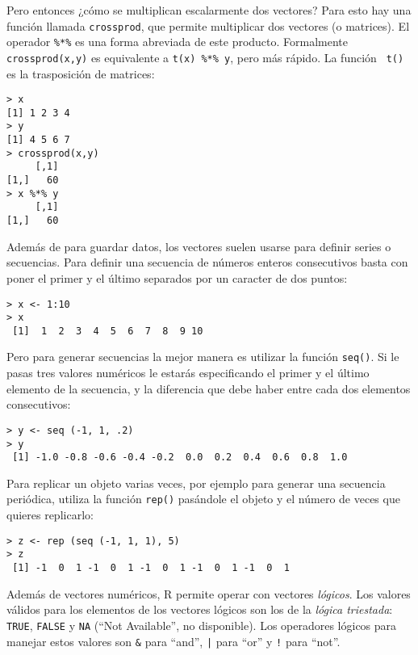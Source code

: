 Pero  entonces ¿cómo  se multiplican  escalarmente dos  vectores? Para
esto hay una función llamada  {\tt crossprod}, que permite multiplicar
dos  vectores  (o  matrices).  El operador  \verb|%*%|  es  una  forma
abreviada  de  este  producto.  Formalmente  {\tt  crossprod(x,y)}  es
equivalente a  {\tt t(x) \%*\%  y}, pero  más rápido. La  función {\tt
t()} es la trasposición de matrices:


\begin{verbatim}
> x
[1] 1 2 3 4
> y
[1] 4 5 6 7
> crossprod(x,y)
     [,1]
[1,]   60
> x %*% y
     [,1]
[1,]   60
\end{verbatim}

Además de para guardar datos,  los vectores suelen usarse para definir
series o  secuencias. Para  definir una  secuencia de  números enteros
consecutivos basta  con poner el primer  y el último separados  por un
caracter de dos puntos:


\begin{verbatim}
> x <- 1:10
> x   
 [1]  1  2  3  4  5  6  7  8  9 10
\end{verbatim}

Pero  para  generar   secuencias  la  mejor  manera   es  utilizar  la
función {\tt  seq()}. Si  le pasas tres  valores numéricos  le estarás
especificando el  primer y el  último elemento  de la secuencia,  y la
diferencia que debe haber entre cada dos elementos consecutivos:

\begin{verbatim}
> y <- seq (-1, 1, .2)
> y
 [1] -1.0 -0.8 -0.6 -0.4 -0.2  0.0  0.2  0.4  0.6  0.8  1.0
\end{verbatim}

Para replicar  un objeto  varias veces, por  ejemplo para  generar una
secuencia  periódica,  utiliza la  función  {\tt  rep()} pasándole  el
objeto y el número de veces que quieres replicarlo:

\begin{verbatim}
> z <- rep (seq (-1, 1, 1), 5)
> z
 [1] -1  0  1 -1  0  1 -1  0  1 -1  0  1 -1  0  1
\end{verbatim}

Además de vectores numéricos, {\sf R} permite operar con vectores {\em
lógicos}.  Los valores  válidos  para los  elementos  de los  vectores
lógicos son los de la {\em lógica  triestada}: 
{\tt TRUE}, {\tt FALSE} y {\tt NA} (``Not Available'', no disponible).
Los operadores  lógicos para manejar  estos valores son {\tt  \&} para
``and'', {\tt |} para ``or'' y {\tt !} para ``not''.

